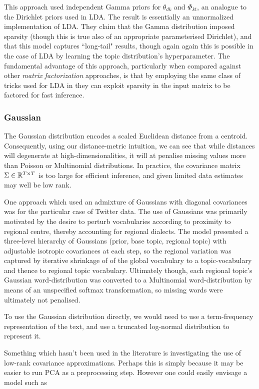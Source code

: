 This approach used independent Gamma priors for $\theta_{dk}$ and $\Phi_{kt}$, an analogue to the Dirichlet priors used in LDA. The result is essentially an unnormalized implementation of LDA. They claim that the Gamma distribution imposed sparsity (though this is true also of an appropriate parameterised Dirichlet), and that this model captures ``long-tail" results, though again again this is possible in the case of LDA by learning the topic distribution's hyperparameter\cite{Wallach2009a}. The fundamental advantage of this approach, particularly when compared against other \emph{matrix factorization} approaches, is that by employing the same class of tricks used for LDA in \cite{Mimno2012a} they can exploit sparsity in the input matrix to be factored for fast inference.

\subsubsection{Gaussian}
The Gaussian distribution encodes a scaled Euclidean distance from a centroid. Consequently, using our distance-metric intuition, we can see that while distances will degenerate at high-dimensionalities, it will at penalise missing values more than Poisson or Multinomial distributions. In practice, the covariance matrix $\Sigma \in { \mathbb{R}^{T \times T} }$ is too large for efficient inference, and given limited data estimates may well be low rank.

One approach which used an admixture of Gaussians with diagonal covariances was for the particular case of Twitter data\cite{Eisenstein2010}. The use of Gaussians was primarily motivated by the desire to perturb vocabularies according to proximity to regional centre, thereby accounting for regional dialects. The model presented a three-level hierarchy of Gaussians (prior, base topic, regional topic) with adjustable isotropic covariances at each step, so the regional variation was captured by iterative shrinkage of of the global vocabulary to a topic-vocabulary and thence to regional topic vocabulary. Ultimately though, each regional topic's Gaussian word-distribution was converted to a Multinomial word-distribution by means of an unspecified softmax transformation, so missing words were ultimately not penalised.

To use the Gaussian distribution directly, we would need to use a term-frequency representation of the text, and use a truncated log-normal distribution to represent it.

Something which hasn't been used in the literature is investigating the use of low-rank covariance approximations. Perhaps this is simply because it may be easier to run PCA as a preprocessing step. However one could easily envisage a model such as

